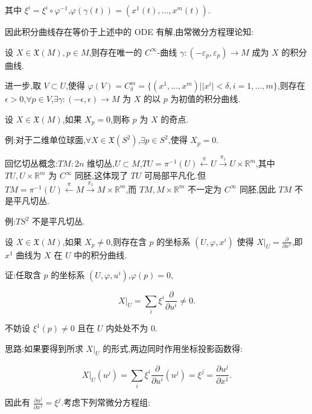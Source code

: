 其中 $\xi^i = \xi^i \circ \varphi^{-1}$,$\varphi(\gamma(t)) = (x^1(t), \ldots, x^m(t))$.

因此积分曲线存在等价于上述中的 ODE 有解,由常微分方程理论知:

\begin{proposition}
设 $X \in \mathfrak{X}(M), p \in M$,则存在唯一的 $C^\infty$-曲线 $\gamma: (-\varepsilon_p, \varepsilon_p) \rightarrow M$ 成为 $X$ 的积分曲线.
\end{proposition}

进一步,取 $V \subset U$,使得 $\varphi(V) = C_\delta^m = \{(x^1, \ldots, x^m)| |x^i| < \delta, i = 1, \ldots, m\}$,则存在 $\epsilon > 0$,$\forall p \in V$,$\exists \gamma : (-\epsilon, \epsilon) \rightarrow M$ 为 $X$ 的以 $p$ 为初值的积分曲线.

\begin{definition}
设 $X \in \mathfrak{X}(M)$,如果 $X_p = 0$,则称 $p$ 为 $X$ 的奇点.
\end{definition}

例:对于二维单位球面,$\forall X \in \mathfrak{X}(S^2)$,$\exists p \in S^2$,使得 $X_p = 0$.

回忆切丛概念:$TM: 2n$ 维切丛,$U \subset M$,$TU = \pi^{-1}(U) \overset{\pi}{\longleftarrow} U \overset{\pi_1}{\longrightarrow} U \times \mathbb{R}^m$,其中 $TU, U \times \mathbb{R}^m$ 为 $C^\infty$ 同胚,这体现了 $TU$ 可局部平凡化.但 $TM = \pi^{-1}(U) \overset{\pi}{\longleftarrow} M \overset{\pi_1}{\longrightarrow} M \times \mathbb{R}^m$,而 $TM, M \times \mathbb{R}^m$ 不一定为 $C^\infty$ 同胚,因此 $TM$ 不是平凡切丛.

例:$TS^2$ 不是平凡切丛.

\begin{theorem}
设 $X \in \mathfrak{X}(M)$,如果 $X_p \neq 0$,则存在含 $p$ 的坐标系 $(U, \varphi, x^i)$ 使得 $X|_U = \frac{\partial}{\partial x^1}$,即 $x^1$ 曲线为 $X$ 在 $U$ 中的积分曲线.
\end{theorem}

证:任取含 $p$ 的坐标系 $(U, \varphi, u^i)$,$\varphi(p) = 0$,

\[
X|_U = \sum_i \xi^i \frac{\partial}{\partial u^i} \neq 0.
\]

不妨设 $\xi^1(p) \neq 0$ 且在 $U$ 内处处不为 0.

思路:如果要得到所求 $X|_U$ 的形式,两边同时作用坐标投影函数得:

\[
X|_U(u^j) = \sum_i \xi^i \frac{\partial}{\partial u^i}(u^j) = \xi^j = \frac{\partial u^j}{\partial x^1}.
\]

因此有 $\frac{\partial u^j}{\partial x^1} = \xi^j$.考虑下列常微分方程组:

